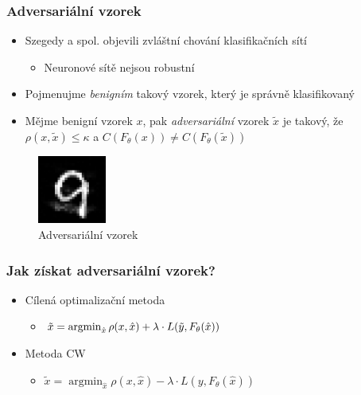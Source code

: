 \documentclass[czech]{beamer}
\begin{document}
\begin{frame}
    \frametitle{Adversariální vzorek}
    \begin{itemize}
        \item Szegedy a spol. objevili zvláštní chování klasifikačních sítí \cite{szegedy2014intriguing}
        \begin{itemize}
            \item Neuronové sítě nejsou robustní
        \end{itemize}
        \item Pojmenujme \emph{benigním} takový vzorek, který je správně klasifikovaný
        \item Mějme benigní vzorek $x$, pak \emph{adversariální} vzorek $\tilde{x}$ je takový, že
        $\rho(x, \tilde{x}) \leq \kappa$ a $C(F_\theta(x)) \neq C(F_\theta(\tilde{x}))$
    \end{itemize}
    \begin{figure}
        \centering
        \includegraphics[width=0.2\textwidth]{Images/adv_pic.png}
        \centering
        \caption{Adversariální vzorek}
    \end{figure}
\end{frame}


\begin{frame}
    \frametitle{Jak získat adversariální vzorek?}
    \begin{itemize}
        \item Cílená optimalizační metoda
        \begin{itemize}
            \item $\tilde{x} = \operatornamewithlimits{argmin}_{\hat{x}} \rho(x, \hat{x}) + \lambda \cdot L(\tilde{y}, F_{\theta}(\hat{x}))$
        \end{itemize}
        \item Metoda CW
        \begin{itemize}
            \item $\tilde{x} = \operatorname{argmin}_{\hat{x}} \rho(x, \hat{x}) - \lambda \cdot L(y, F_{\theta}(\hat{x}))$
        \end{itemize}
    \end{itemize}
\end{frame}
\end{document}
